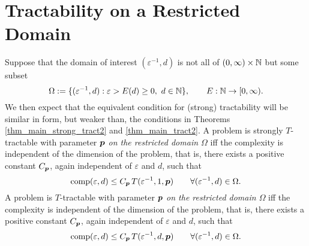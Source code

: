 \documentclass[11pt,a4paper]{article}
\newcommand{\peter}[1]{\begingroup\color{purple}#1\endgroup}
\begin{document}
\section{Tractability on a Restricted Domain}

Suppose that the domain of interest $(\varepsilon^{-1},d)$ is not all of $(0,\infty) \times \mathbb{N}$ but some subset
\begin{equation}
    \Omega  := \{(\varepsilon^{-1},d) : \varepsilon > E(d) \ge 0, \ d \in \mathbb{N} \}, \qquad E : \mathbb{N} \to [0,\infty).
\end{equation}
We then expect that the equivalent condition for (strong) tractability will be similar in form, but weaker than, the conditions in Theorems  \ref{thm_main_strong_tract2} and \ref{thm_main_tract2}.
A problem is \peter{strongly}
$T$-tractable with parameter $\boldsymbol{p}$ \emph{on the restricted domain $\Omega$} iff the complexity is independent of the dimension of the problem, that is, there exists a positive constant $C_{\boldsymbol{p}}$, again independent of $\varepsilon$ and $d$, such that
\begin{equation} \label{eq:rest_strong_tract_def}
	\operatorname{comp}(\varepsilon,d) \le C_{\boldsymbol{p}}\, T(\varepsilon^{-1},1,\boldsymbol{p}) \qquad \forall(\varepsilon^{-1},d) \in \Omega.
\end{equation}
A problem is 
$T$-tractable with parameter $\boldsymbol{p}$ \emph{on the restricted domain $\Omega$} iff the complexity is independent of the dimension of the problem, that is, there exists a positive constant $C_{\boldsymbol{p}}$, again independent of $\varepsilon$ and $d$, such that
\begin{equation} \label{eq:rest_tract_def}
	\operatorname{comp}(\varepsilon,d) \le C_{\boldsymbol{p}}\, T(\varepsilon^{-1},d,\boldsymbol{p}) \qquad \forall(\varepsilon^{-1},d) \in \Omega.
\end{equation}
\end{document}
